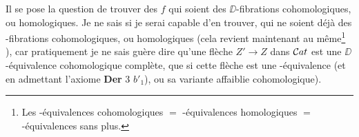 

Il se pose la question de trouver des $f$ qui soient des $\DD$-fibrations cohomologiques, ou homologiques. Je ne sais si je serai capable d'en trouver, qui ne soient déjà des \HOT-fibrations cohomologiques, ou homologiques (cela revient maintenant au même\footnote[55]{Les \HOT-équivalences cohomologiques $=$ \HOT-équivalences homologiques $=$ \HOT-équivalences sans plus.} ), car pratiquement je ne sais guère dire qu'une flèche $Z' \to Z$ dans $\mathcal{C}at$ est une $\DD$-équivalence cohomologique complète, que si cette flèche est une \HOT-équivalence (et en admettant l'axiome \textbf{Der} 3 $b'_1$), ou sa variante affaiblie cohomologique).

